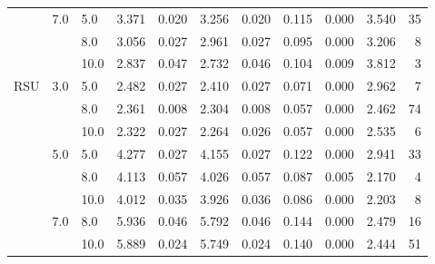 \begin{tabular}{lllrrrrrrrr}
    & 7.0 & 5.0  & 3.371 &     0.020 &  3.256 &     0.020 &      0.115 &   0.000 &     3.540 &  35 \\
    &     & 8.0  & 3.056 &     0.027 &  2.961 &     0.027 &      0.095 &   0.000 &     3.206 &   8 \\
    &     & 10.0 & 2.837 &     0.047 &  2.732 &     0.046 &      0.104 &   0.009 &     3.812 &   3 \\
RSU & 3.0 & 5.0  & 2.482 &     0.027 &  2.410 &     0.027 &      0.071 &   0.000 &     2.962 &   7 \\
    &     & 8.0  & 2.361 &     0.008 &  2.304 &     0.008 &      0.057 &   0.000 &     2.462 &  74 \\
    &     & 10.0 & 2.322 &     0.027 &  2.264 &     0.026 &      0.057 &   0.000 &     2.535 &   6 \\
    & 5.0 & 5.0  & 4.277 &     0.027 &  4.155 &     0.027 &      0.122 &   0.000 &     2.941 &  33 \\
    &     & 8.0  & 4.113 &     0.057 &  4.026 &     0.057 &      0.087 &   0.005 &     2.170 &   4 \\
    &     & 10.0 & 4.012 &     0.035 &  3.926 &     0.036 &      0.086 &   0.000 &     2.203 &   8 \\
    & 7.0 & 8.0  & 5.936 &     0.046 &  5.792 &     0.046 &      0.144 &   0.000 &     2.479 &  16 \\
    &     & 10.0 & 5.889 &     0.024 &  5.749 &     0.024 &      0.140 &   0.000 &     2.444 &  51 \\
\bottomrule
\end{tabular}
